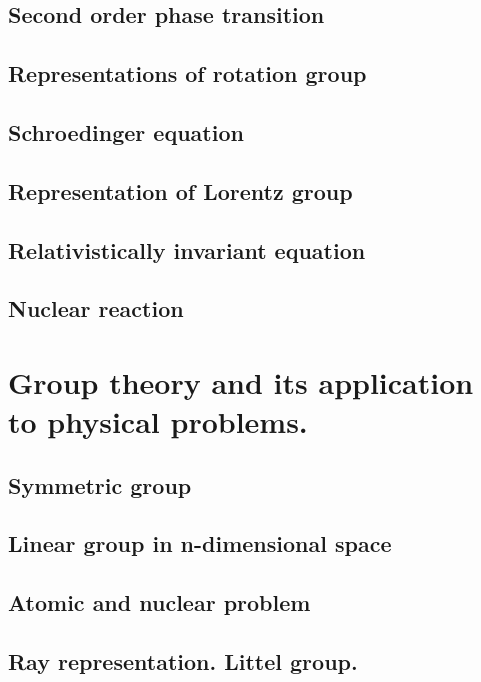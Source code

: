 \documentclass[oneside,12pt]{memoir}
\begin{document}
\section{Second order phase transition}

\section{Representations of rotation group}

\section{\texorpdfstring{Schr\:oedinger}{Schroedinger} equation}

\section{Representation of Lorentz group}

\section{Relativistically invariant equation}

\section{Nuclear reaction}


\chapter{Group theory and its application to physical problems.}
\PartialToc

\section{Symmetric group}

\section{Linear group in n-dimensional space}

\section{Atomic and nuclear problem}

\section{Ray representation. Littel group.}
\end{document}
